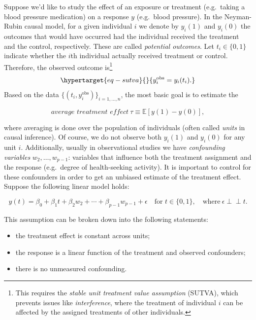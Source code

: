 \documentclass[
  11pt,
  letterpaper,
  oneside]{book}
\providecommand{\tightlist}{%
  \setlength{\itemsep}{0pt}\setlength{\parskip}{0pt}}\usepackage{longtable,booktabs,array}
\theoremstyle{plain}
\theoremstyle{plain}
\theoremstyle{definition}
\theoremstyle{definition}
\theoremstyle{plain}
\theoremstyle{remark}
\begin{document}
Suppose we'd like to study the effect of an exposure or treatment
(e.g.~taking a blood pressure medication) on a response \(y\)
(e.g.~blood pressure). In the Neyman-Rubin causal model, for a given
individual \(i\) we denote by \(y_i(1)\) and \(y_i(0)\) the outcomes
that would have occurred had the individual received the treatment and
the control, respectively. These are called \emph{potential outcomes}.
Let \(t_i \in \{0,1\}\) indicate whether the \(i\)th individual actually
received treatment or control. Therefore, the observed outcome
is\footnote{This requires the \emph{stable unit treatment value
  assumption} (SUTVA), which prevents issues like \emph{interference},
  where the treatment of individual \(i\) can be affected by the
  assigned treatments of other individuals.}
\begin{equation}\protect\hypertarget{eq-sutva}{}{
y_i^{\text{obs}} = y_i(t_i). 
}\label{eq-sutva}\end{equation} Based on the data
\(\{(t_i, y_i^{\text{obs}})\}_{i = 1, \dots, n}\), the most basic goal
is to estimate the

\[
\textit{average treatment effect} \  \tau \equiv \mathbb{E}[y(1) - y(0)],
\]

where averaging is done over the population of individuals (often called
\emph{units} in causal inference). Of course, we do not observe both
\(y_i(1)\) and \(y_i(0)\) for any unit \(i\). Additionally, usually in
observational studies we have \emph{confounding variables}
\(w_2, \dots, w_{p-1}\): variables that influence both the treatment
assignment and the response (e.g.~degree of health-seeking activity). It
is important to control for these confounders in order to get an
unbiased estimate of the treatment effect. Suppose the following linear
model holds:

\[
y(t) = \beta_0 + \beta_1 t + \beta_2 w_2 + \cdots + \beta_{p-1} w_{p-1} + \epsilon \quad \text{for } t \in \{0, 1\}, \quad \text{where} \ \epsilon \perp\!\!\!\perp t.
\]

This assumption can be broken down into the following statements:

\begin{itemize}
\tightlist
\item
  the treatment effect is constant across units;
\item
  the response is a linear function of the treatment and observed
  confounders;
\item
  there is no unmeasured confounding.
\end{itemize}
\end{document}

